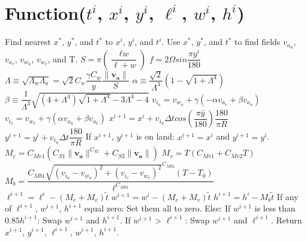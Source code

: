 \documentclass[12pt]{article}
\begin{document}
\section{Function($t^i$, $x^i$, $y^i$, $\ell^i$, $w^i$, $h^i$)}
Find nearest $x^*$, $y^*$, and $t^*$ to $x^i$, $y^i$, and $t^i$.\newline
Use $x^*$, $y^*$, and $t^*$ to find fields $v_{a_u}$, $v_{a_v}$, $v_{w_u}$, 
$v_{w_v}$, and T.\newline
$S = \pi(\dfrac{\ell\textit{w}}{\ell+\textit{w}})$\newline
$\mathit{f} = 2\Omega sin\dfrac{\pi y^i}{180}$\newline
$\Lambda \equiv \sqrt{\Lambda_w\Lambda_a} = 
\sqrt{2}C_w\dfrac{\gamma C_w}{y}\dfrac{\lVert\mathbf{v_a}\rVert}{S}$\newline
$\alpha \equiv \dfrac{\sqrt{2}}{\Lambda^3}(1-\sqrt{1+\Lambda^4})$\newline
$\beta \equiv \dfrac{1}{\Lambda^3}\sqrt{(4+\Lambda^4)\sqrt{1+\Lambda^4}
- 3\Lambda^4 - 4}$\newline
$v_{i_u} = v_{w_u} + \gamma(-\alpha v_{a_v} + \beta v_{a_u})$\newline
$v_{i_v} = v_{w_v} + \gamma(\alpha v_{a_u} + \beta v_{a_v})$\newline
$x^{i+1} = x^{i} + v_{i_u} \Delta t cos(\dfrac{\pi \bar{y}}{180})\dfrac{180}
{\pi R}$\newline
$y^{i+1} = y^i + v_{i_u} \Delta t \dfrac{180}{\pi R}$\newline
If $x^{i+1}$, $y^{i+1}$ is on land:\newline
\indent $x^{i+1} = x^i$ and $y^{i+1} = y^i$.\newline 
$M_e = C_{Me1}(C_{S1}\lVert\mathbf{v_a}\rVert^{C_{S2}} + 
C_{S3}\lVert\mathbf{v_a}\rVert)$\newline
$M_v = T(C_{Mv1} + C_{Mv2}T)$\newline
$M_b = \dfrac{C_{Mb1}\sqrt{(v_{i_u} - v_{w_u})^2 + (v_{i_v} - v_{w_v})^2}^
{C_{Mb2}}(T-T_0)}{\ell^{C_{Mb3}}}$\newline
$\ell^{i+1} = \ell^i - (M_e + M_v)\tilde{t}$\newline
$w^{i+1} = w^i - (M_e + M_v)\tilde{t}$\newline
$h^{i+1} = h^i - M_b\tilde{t}$\newline
If any of $\ell^{i+1}$, $w^{i+1}$, $h^{i+1}$ equal zero:\newline
\indent Set them all to zero.\newline
Else:\newline 
\indent If $w^{i+1}$ is less than $0.85 h^{i+1}$:\newline
\indent \indent Swap $w^{i+1}$ and $h^{i+1}$.\newline
\indent If $w^{i+1}$ > $\ell^{i+1}$:\newline
\indent \indent Swap $w^{i+1}$ and $\ell^{i+1}$.\newline
Return $x^{i+1}$, $y^{i+1}$, $\ell^{i+1}$, $w^{i+1}$, $h^{i+1}$.\newline
\end{document}
